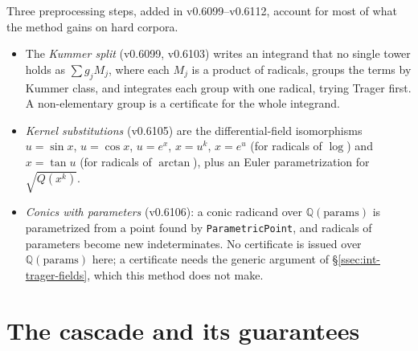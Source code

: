 Three preprocessing steps, added in v0.6099--v0.6112, account for most of what the
method gains on hard corpora.
\begin{itemize}
\item The \emph{Kummer split} (v0.6099, v0.6103) writes an
integrand that no single tower holds as \(\sum g_j M_j\), where each \(M_j\) is a
product of radicals, groups the terms by Kummer class, and integrates each group
with one radical, trying Trager first. A non-elementary group is a certificate for
the whole integrand.
\item \emph{Kernel substitutions} (v0.6105) are the differential-field
isomorphisms \(u=\sin x\), \(u=\cos x\), \(u=e^x\), \(x=u^k\), \(x=e^u\) (for
radicals of \(\log\)) and \(x=\tan u\) (for radicals of \(\arctan\)), plus an Euler
parametrization for \(\sqrt{Q(x^k)}\).
\item \emph{Conics with parameters} (v0.6106): a conic radicand over
\(\mathbb{Q}(\text{params})\) is parametrized from a point found by
\texttt{ParametricPoint}, and radicals of parameters become new indeterminates. No
certificate is issued over \(\mathbb{Q}(\text{params})\) here; a certificate needs
the generic argument of \S\ref{ssec:int-trager-fields}, which this method does not
make.
\end{itemize}

\section{The cascade and its guarantees}
\label{sec:int-cascade}

